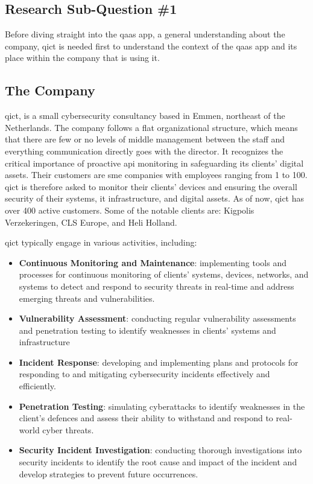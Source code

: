 \begin{multicols}{2}
      \clearpage

      \section{Research Sub-Question \#1}
      Before diving straight into the \acrshort{qaas} app, a general understanding about the company, \acrshort{qict}
      is needed first to understand the context of the \acrshort{qaas} app and its place within the company that is
      using it.

      \subsection{The Company}

      \acrshort{qict}, is a small cybersecurity consultancy based in Emmen, northeast of the Netherlands. The company follows
      a flat organizational structure, which means that there are few or no levels of middle management between the staff and
      everything communication directly goes with the director. It recognizes the critical importance of proactive \acrshort{api}
      monitoring in safeguarding its clients' digital assets. Their customers are \acrshort{sme} companies with employees ranging
      from 1 to 100. \acrshort{qict} is therefore asked to monitor their clients' devices and ensuring the overall security of their
      systems, \acrshort{it} infrastructure, and digital assets. As of now, \acrshort{qict} has over 400 active customers. Some of
      the notable clients are: Kigpolis Verzekeringen, CLS Europe, and Heli Holland.

      \acrshort{qict} typically engage in various activities, including:
      \begin{itemize}
            \item \textbf{Continuous Monitoring and Maintenance}: implementing tools and processes for continuous
                  monitoring of clients' systems, devices, networks, and systems to detect and respond to security
                  threats in real-time and address emerging threats and vulnerabilities.
            \item \textbf{Vulnerability Assessment}: conducting regular vulnerability assessments and penetration
                  testing to identify weaknesses in clients' systems and infrastructure
            \item \textbf{Incident Response}: developing and implementing plans and protocols for responding to
                  and mitigating cybersecurity incidents effectively and efficiently.
            \item \textbf{Penetration Testing}: simulating cyberattacks to identify weaknesses in the client's
                  defences and assess their ability to withstand and respond to real-world cyber threats.
            \item \textbf{Security Incident Investigation}: conducting thorough investigations into security
                  incidents to identify the root cause and impact of the incident and develop strategies to prevent
                  future occurrences.
      \end{itemize}

\end{multicols}
